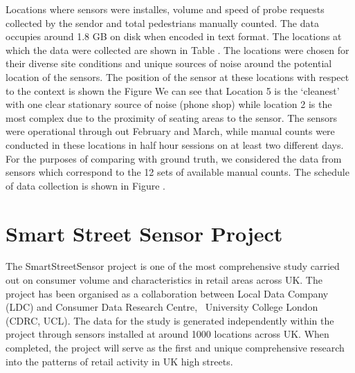 Locations where sensors were installes, volume and speed of probe requests collected by the sendor and total pedestrians manually counted.
The data occupies around 1.8 GB on disk when encoded in text format.
The locations at which the data were collected are shown in Table .
The locations were chosen for their diverse site conditions and unique sources of noise around the potential location of the sensors.
The position of the sensor at these locations with respect to the context is shown the Figure 
We can see that Location 5 is the `cleanest' with one clear stationary source of noise (phone shop) while location 2 is the most complex due to the proximity of seating areas to the sensor.
The sensors were operational through out February and March, while manual counts were conducted in these locations in half hour sessions on at least two different days.
For the purposes of comparing with ground truth, we considered the data from sensors which correspond to the 12 sets of available manual counts.
The schedule of data collection is shown in Figure .


\section{Smart Street Sensor Project}

The SmartStreetSensor project is one of the most comprehensive study carried out on consumer volume and characteristics in retail areas across UK.
The project has been organised as a collaboration between Local Data Company (LDC) and Consumer Data Research Centre,  University College London (CDRC, UCL).
The data for the study is generated independently within the project through sensors installed at around 1000 locations across UK.
When completed, the project will serve as the first and unique comprehensive research into the patterns of retail activity in UK high streets.

